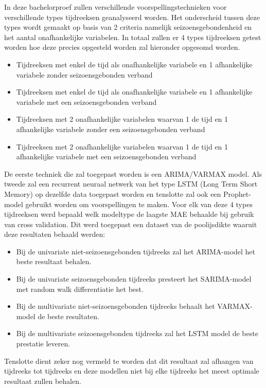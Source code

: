In deze bachelorproef zullen verschillende voorspellingstechnieken voor verschillende types tijdreeksen geanalyseerd worden. Het onderscheid tussen deze types wordt gemaakt op basis van 2 criteria namelijk seizoensgebondenheid en het aantal onafhankelijke variabelen. In totaal zullen er 4 types tijdreeksen getest worden hoe deze precies opgesteld worden zal hieronder opgesomd worden.
\begin{itemize}
    \item Tijdreeksen met enkel de tijd als onafhankelijke variabele en 1 afhankelijke variabele zonder seizoensgebonden verband
    \item Tijdreeksen met enkel de tijd als onafhankelijke variabele en 1 afhankelijke variabele met een seizoensgebonden verband
    \item Tijdreeksen met 2 onafhankelijke variabelen waarvan 1 de tijd en 1 afhankelijke variabele zonder een seizoensgebonden verband
    \item Tijdreeksen met 2 onafhankelijke variabelen waarvan 1 de tijd en 1 afhankelijke variabele met een seizoensgebonden verband
\end{itemize} De eerste techniek die zal toegepast worden is een
 ARIMA/VARMAX model. Als tweede zal een  recurrent neuraal netwerk van het type LSTM (Long Term Short Memory) op dezelfde data toegepast worden en tenslotte zal ook een Prophet-model gebruikt worden om voorspellingen te maken. Voor elk van deze 4 types tijdreeksen werd bepaald welk modeltype de laagste MAE behaalde bij gebruik van cross validation. Dit werd toegepast een dataset van de poolijsdikte waaruit deze resultaten behaald werden:
 \begin{itemize}
     \item Bij de univariate niet-seizoensgebonden tijdreeks zal het ARIMA-model het beste resultaat behalen.
     \item Bij de univariate seizoensgebonden tijdreeks presteert het SARIMA-model met random walk differentiatie het best.
     \item Bij de multivariate niet-seizoensgebonden tijdreeks behaalt het VARMAX-model de beste resultaten.
     \item Bij de multivariate seizoensgebonden tijdreeks zal het LSTM model de beste prestatie leveren.
 \end{itemize}

Tenslotte dient zeker nog vermeld te worden dat dit resultaat zal afhangen van tijdreeks tot tijdreeks en deze modellen niet bij elke tijdreeks het meest optimale resultaat zullen behalen.
